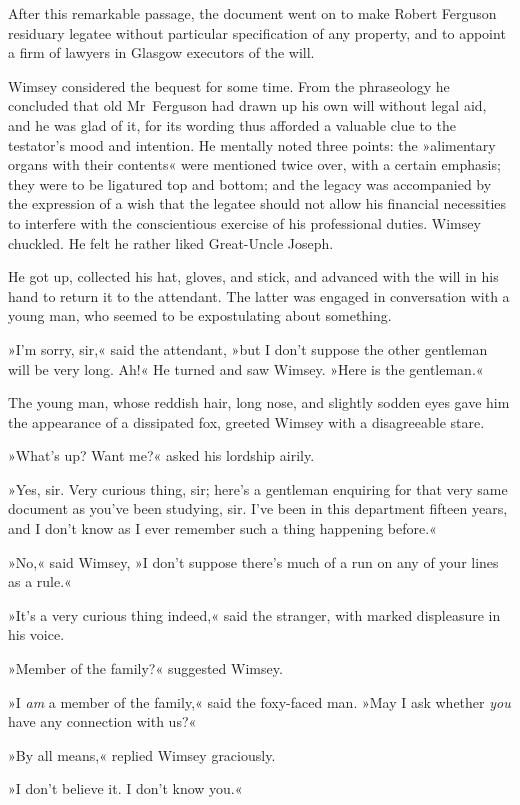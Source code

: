After this remarkable passage, the document went on to make Robert Ferguson residuary legatee without particular specification of any property, and to appoint a firm of lawyers in Glasgow executors of the will.

Wimsey considered the bequest for some time. From the phraseology he concluded that old Mr~Ferguson had drawn up his own will without legal aid, and he was glad of it, for its wording thus afforded a valuable clue to the testator's mood and intention. He mentally noted three points: the »alimentary organs with their contents« were mentioned twice over, with a certain emphasis; they were to be ligatured top and bottom; and the legacy was accompanied by the expression of a wish that the legatee should not allow his financial necessities to interfere with the conscientious exercise of his professional duties. Wimsey chuckled. He felt he rather liked Great-Uncle Joseph.

He got up, collected his hat, gloves, and stick, and advanced with the will in his hand to return it to the attendant. The latter was engaged in conversation with a young man, who seemed to be expostulating about something.

»I'm sorry, sir,« said the attendant, »but I don't suppose the other gentleman will be very long. Ah!« He turned and saw Wimsey. »Here is the gentleman.«

The young man, whose reddish hair, long nose, and slightly sodden eyes gave him the appearance of a dissipated fox, greeted Wimsey with a disagreeable stare.

»What's up? Want me?« asked his lordship airily.

»Yes, sir. Very curious thing, sir; here's a gentleman enquiring for that very same document as you've been studying, sir. I've been in this department fifteen years, and I don't know as I ever remember such a thing happening before.«

»No,« said Wimsey, »I don't suppose there's much of a run on any of your lines as a rule.«

»It's a very curious thing indeed,« said the stranger, with marked displeasure in his voice.

»Member of the family?« suggested Wimsey.

»I \textit{am} a member of the family,« said the foxy-faced man. »May I ask whether \textit{you} have any connection with us?«

»By all means,« replied Wimsey graciously.

»I don't believe it. I don't know you.«

